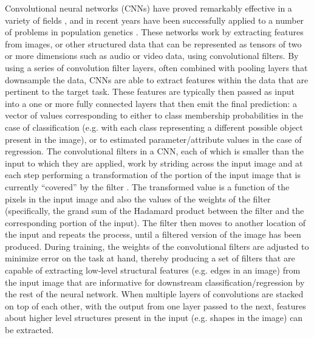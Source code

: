 Convolutional neural networks (CNNs) have proved remarkably effective in a variety of fields \cite{erhanScalableObjectDetection2013,hochreiterLongShortTermMemory1997,lecunGradientbasedLearningApplied1998,guRecentAdvancesConvolutional2018,liSurveyConvolutionalNeural2022}, and in recent years have been successfully applied to a number of problems in population genetics \cite{korfmannDeepLearningPopulation2023a,schriderSupervisedMachineLearning2018,sheehanDeepLearningPopulation2016}. These networks work by extracting features from images, or other structured data that can be represented as tensors of two or more dimensions such as audio or video data, using convolutional filters. By using a series of convolution filter layers, often combined with pooling layers that downsample the data, CNNs are able to extract features within the data that are pertinent to the target task. These features are typically then passed as input into a one or more fully connected layers that then emit the final prediction: a vector of values corresponding to either to class membership probabilities in the case of classification (e.g. with each class representing a different possible object present in the image), or to estimated parameter/attribute values in the case of regression. The convolutional filters in a CNN, each of which is smaller than the input to which they are applied, work by striding across the input image and at each step performing a transformation of the portion of the input image that is currently “covered” by the filter \cite{lecunBackpropagationAppliedHandwritten1989}. The transformed value is a function of the pixels in the input image and also the values of the weights of the filter (specifically, the grand sum of the Hadamard product between the filter and the corresponding portion of the input). The filter then moves to another location of the input and repeats the process, until a filtered version of the image has been produced. During training, the weights of the convolutional filters are adjusted to minimize error on the task at hand, thereby producing a set of filters that are capable of extracting low-level structural features (e.g. edges in an image) from the input image that are informative for downstream classification/regression by the rest of the neural network. When multiple layers of convolutions are stacked on top of each other, with the output from one layer passed to the next, features about higher level structures present in the input (e.g. shapes in the image) can be extracted.


